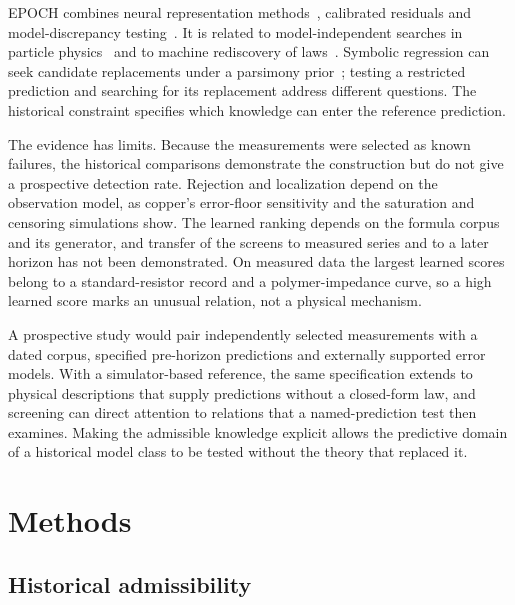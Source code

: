 \documentclass{article}
\begin{document}
EPOCH combines neural representation methods~\cite{wang2023discovery,xu2021extrapolate}, calibrated residuals and model-discrepancy testing~\cite{angelopoulos2023conformal,page1954cusum,kennedy2001bayesian}. It is related to model-independent searches in particle physics~\cite{dagnolo2019newphysics} and to machine rediscovery of laws~\cite{guimera2020bayesian,udrescu2020feynman,schmidt2009distilling}. Symbolic regression can seek candidate replacements under a parsimony prior~\cite{he2026searchfree}; testing a restricted prediction and searching for its replacement address different questions. The historical constraint specifies which knowledge can enter the reference prediction.

The evidence has limits. Because the measurements were selected as known failures, the historical comparisons demonstrate the construction but do not give a prospective detection rate. Rejection and localization depend on the observation model, as copper's error-floor sensitivity and the saturation and censoring simulations show. The learned ranking depends on the formula corpus and its generator, and transfer of the screens to measured series and to a later horizon has not been demonstrated. On measured data the largest learned scores belong to a standard-resistor record and a polymer-impedance curve, so a high learned score marks an unusual relation, not a physical mechanism.

A prospective study would pair independently selected measurements with a dated corpus, specified pre-horizon predictions and externally supported error models. With a simulator-based reference, the same specification extends to physical descriptions that supply predictions without a closed-form law, and screening can direct attention to relations that a named-prediction test then examines. Making the admissible knowledge explicit allows the predictive domain of a historical model class to be tested without the theory that replaced it.

\section{Methods}

\subsection{Historical admissibility}
\end{document}
